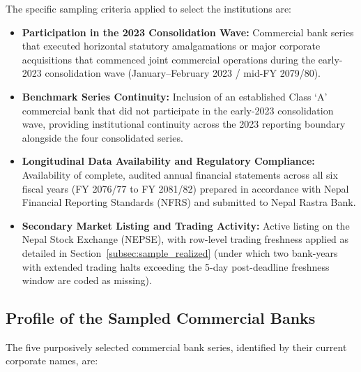 The specific sampling criteria applied to select the institutions are:
\begin{itemize}
    \item \textbf{Participation in the 2023 Consolidation Wave:} Commercial bank series that executed horizontal statutory amalgamations or major corporate acquisitions that commenced joint commercial operations during the early-2023 consolidation wave (January--February 2023 / mid-FY 2079/80).
    \item \textbf{Benchmark Series Continuity:} Inclusion of an established Class `A' commercial bank that did not participate in the early-2023 consolidation wave, providing institutional continuity across the 2023 reporting boundary alongside the four consolidated series.
    \item \textbf{Longitudinal Data Availability and Regulatory Compliance:} Availability of complete, audited annual financial statements across all six fiscal years (FY 2076/77 to FY 2081/82) prepared in accordance with Nepal Financial Reporting Standards (NFRS) and submitted to Nepal Rastra Bank.
    \item \textbf{Secondary Market Listing and Trading Activity:} Active listing on the Nepal Stock Exchange (NEPSE), with row-level trading freshness applied as detailed in Section~\ref{subsec:sample_realized} (under which two bank-years with extended trading halts exceeding the 5-day post-deadline freshness window are coded as missing).
\end{itemize}

\subsection{Profile of the Sampled Commercial Banks}
The five purposively selected commercial bank series, identified by their current corporate names, are:

